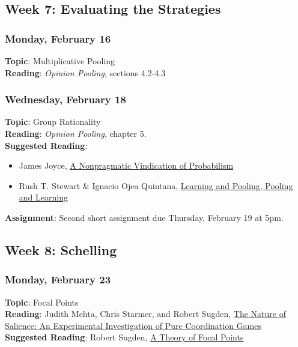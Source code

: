 \documentclass[
  letterpaper,
  DIV=11,
  numbers=noendperiod]{scrartcl}
\providecommand{\tightlist}{%
  \setlength{\itemsep}{0pt}\setlength{\parskip}{0pt}}
\begin{document}
\subsection{Week 7: Evaluating the
Strategies}\label{week-7-evaluating-the-strategies}

\subsubsection{Monday, February 16}\label{monday-february-16}

\textbf{Topic}: Multiplicative Pooling\\
\textbf{Reading}: \emph{Opinion Pooling}, sections 4.2-4.3

\subsubsection{Wednesday, February 18}\label{wednesday-february-18}

\textbf{Topic}: Group Rationality\\
\textbf{Reading}: \emph{Opinion Pooling}, chapter 5.\\
\textbf{Suggested Reading}:

\begin{itemize}
\tightlist
\item
  James Joyce,
  \href{https://philpapers.org/go.pl?id=JOYANV-2&proxyId=&u=http\%3A\%2F\%2Ffitelson.org\%2Ftopics\%2Fjoyce_1998.pdf}{A
  Nonpragmatic Vindication of Probabilism}
\item
  Rush T. Stewart \& Ignacio Ojea Quintana,
  \href{https://philpapers.org/go.pl?id=STELAP-15&proxyId=&u=https\%3A\%2F\%2Fdx.doi.org\%2F10.1007\%2Fs10670-017-9894-2}{Learning
  and Pooling, Pooling and Learning}
\end{itemize}

\textbf{Assignment}: Second short assignment due Thursday, February 19
at 5pm.

\subsection{Week 8: Schelling}\label{week-8-schelling}

\subsubsection{Monday, February 23}\label{monday-february-23}

\textbf{Topic}: Focal Points\\
\textbf{Reading}: Judith Mehta, Chris Starmer, and Robert Sugden,
\href{https://www.jstor.org/stable/2118074}{The Nature of Salience: An
Experimental Investigation of Pure Coordination Games}\\
\textbf{Suggested Reading}: Robert Sugden,
\href{https://www.jstor.org/stable/2235016}{A Theory of Focal Points}
\end{document}
